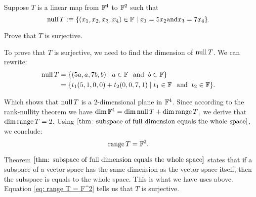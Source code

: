 %
%

\begin{xrcs}
  Suppose $T$ is a linear map from $\mathbb{F}^4$ to $\mathbb{F}^2$ such that
  \begin{equation}
    \operatorname{null} T :\equiv \{(x_1, x_2, x_3, x_4) \in \mathbb{F} \mid x_1 = 5x_2 \text{and} x_3 = 7x_4 \}.
  \end{equation}

  Prove that $T$ is surjective.

  \begin{xprf}
    To prove that $T$ is surjective, we need to find the dimension of $\operatorname{null} T$. We can rewrite:
    \begin{equation}
      \begin{aligned}
        \operatorname{null} T &= \{(5a, a, 7b,b) \mid a \in \mathbb{F} \;\;\, \text{and}\;\; b \in \mathbb{F} \} \\
                  &= \{t_1 (5,1,0,0) + t_2(0,0,7,1) \mid t_1 \in \mathbb{F} \;\;\, \text{and}\;\; t_2 \in \mathbb{F} \}.
      \end{aligned}
    \end{equation}

    Which shows that $\operatorname{null} T$ is a $2$-dimensional plane in $\mathbb{F}^4$. Since according to the rank-nullity theorem we have $\dim \mathbb{F}^4 = \dim \operatorname{null} T + \dim \operatorname{range} T$, we derive that $\dim \operatorname{range} T = 2$. Using $\ref{thm: subspace of full dimension equals the whole space}$, we conclude:
    \begin{equation}
      \label{eq: range T = F^2}
      \operatorname{range} T = \mathbb{F}^2.
    \end{equation}

    Theorem $\ref{thm: subspace of full dimension equals the whole space}$ states that if a subspace of a vector space has the same dimension as the vector space itself, then the subspace is equals to the whole space. This is what we have uses above. Equation \eqref{eq: range T = F^2} tells us that $T$ is surjective.
  \end{xprf}
\end{xrcs}

